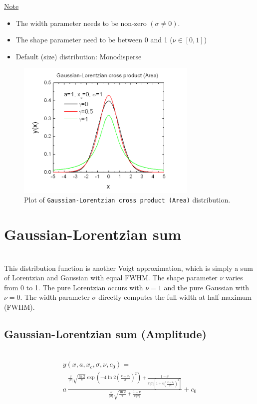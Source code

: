 \underline{Note}
\begin{itemize}
  \item The width parameter needs to be non-zero $(\sigma\neq 0)$.
  \item The shape parameter need to be between 0 and 1 ($\nu\in [0,1]$)
  \item Default (size) distribution: Monodisperse
\end{itemize}
\begin{figure}[htb]
\begin{center}
\includegraphics[width=0.768\textwidth]{GaussianLorentzianCrossProductArea.png}
\end{center}
\caption{Plot of \texttt{Gaussian-Lorentzian cross product (Area)} distribution.}
\label{fig:GaussianLorentzianCrossProductArea}
\end{figure}
\clearpage

\section{Gaussian-Lorentzian sum} ~\\
\label{sec:GaussianLorentzianSum}
This distribution function is another Voigt approximation, which is simply a sum of
Lorentzian and Gaussian with equal FWHM. The shape parameter $\nu$ varies from 0 to 1. The pure
Lorentzian occurs with $\nu=1$ and the pure Gaussian with $\nu=0$. The width parameter $\sigma$
directly computes the full-width at half-maximum (FWHM).

\vspace{5mm} \clearpage

\subsection{Gaussian-Lorentzian sum (Amplitude)} ~\\
\label{sec:GaussianLorentzianSumAmplitude}
\begin{multline}
y(x,a,x_c,\sigma,\nu,c_0) = \\
a\,\frac{\frac{\nu}{|\sigma|}\sqrt{\frac{\ln 2}{\pi}}\exp\left(-4\ln
2\left(\frac{x-x_c}{|\sigma|}\right)^2\right)+\frac{1-\nu}{\pi|\sigma|\left[1+4\left(\frac{x-x_c}{|\sigma|}\right)^2\right]}}{\frac{\nu}{|\sigma|}\sqrt{\frac{\ln
2}{\pi}}+\frac{1-\nu}{\pi|\sigma|}} + c_0
\end{multline}

